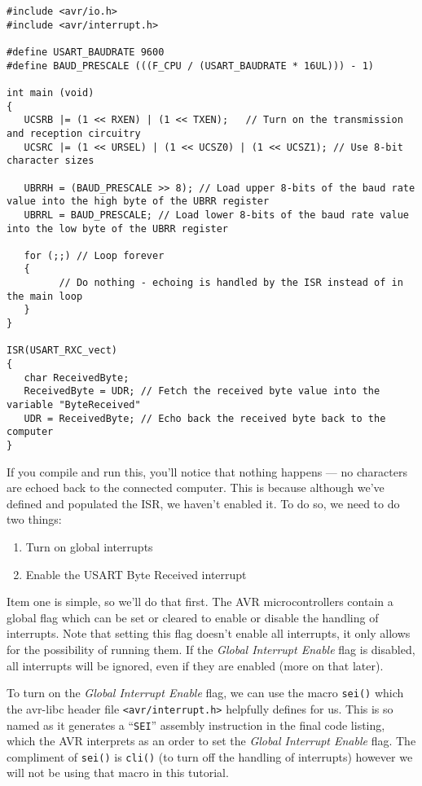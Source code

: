 \documentclass[a4paper,oneside]{book}
\begin{document}
\begin{center}
\begin{lstlisting}
#include <avr/io.h>
#include <avr/interrupt.h>

#define USART_BAUDRATE 9600
#define BAUD_PRESCALE (((F_CPU / (USART_BAUDRATE * 16UL))) - 1)

int main (void)
{
   UCSRB |= (1 << RXEN) | (1 << TXEN);   // Turn on the transmission and reception circuitry
   UCSRC |= (1 << URSEL) | (1 << UCSZ0) | (1 << UCSZ1); // Use 8-bit character sizes

   UBRRH = (BAUD_PRESCALE >> 8); // Load upper 8-bits of the baud rate value into the high byte of the UBRR register
   UBRRL = BAUD_PRESCALE; // Load lower 8-bits of the baud rate value into the low byte of the UBRR register

   for (;;) // Loop forever
   {
         // Do nothing - echoing is handled by the ISR instead of in the main loop
   }   
}

ISR(USART_RXC_vect)
{
   char ReceivedByte;
   ReceivedByte = UDR; // Fetch the received byte value into the variable "ByteReceived"
   UDR = ReceivedByte; // Echo back the received byte back to the computer
}
\end{lstlisting}
\end{center}

If you compile and run this, you'll notice that nothing happens --- no characters are echoed back to the connected computer. This is because although we've defined and populated the ISR, we haven't enabled it. To do so, we need to do two things:

\begin{enumerate}
	\item Turn on global interrupts
    \item Enable the USART Byte Received interrupt
\end{enumerate}

Item one is simple, so we'll do that first. The AVR microcontrollers contain a global flag which can be set or cleared to enable or disable the handling of interrupts. Note that setting this flag doesn't enable all interrupts, it only allows for the possibility of running them. If the \emph{Global Interrupt Enable} flag is disabled, all interrupts will be ignored, even if they are enabled (more on that later).

To turn on the \emph{Global Interrupt Enable} flag, we can use the macro \texttt{sei()} which the avr-libc header file \texttt{<avr/interrupt.h>} helpfully defines for us. This is so named as it generates a ``\texttt{SEI}'' assembly instruction in the final code listing, which the AVR interprets as an order to set the \emph{Global Interrupt Enable} flag. The compliment of \texttt{sei()} is \texttt{cli()} (to turn off the handling of interrupts) however we will not be using that macro in this tutorial.
\end{document}
